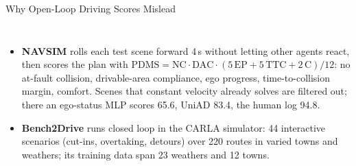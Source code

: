 \begin{frame}{Why Open-Loop Driving Scores Mislead}
\begin{columns}[T,onlytextwidth]
      \begin{itemize}\scriptsize\itemsep0.2em
        \item \textbf{NAVSIM} rolls each test scene forward 4\,s without letting other agents react, then scores the plan with $\mathrm{PDMS} = \mathrm{NC}\cdot\mathrm{DAC}\cdot(5\,\mathrm{EP} + 5\,\mathrm{TTC} + 2\,\mathrm{C})/12$: no at-fault collision, drivable-area compliance, ego progress, time-to-collision margin, comfort. Scenes that constant velocity already solves are filtered out; there an ego-status MLP scores 65.6, UniAD 83.4, the human log 94.8.
        \item \textbf{Bench2Drive} runs closed loop in the CARLA simulator: 44 interactive scenarios (cut-ins, overtaking, detours) over 220 routes in varied towns and weathers; its training data span 23 weathers and 12 towns.
      \end{itemize}
  \end{columns}
\end{frame}

